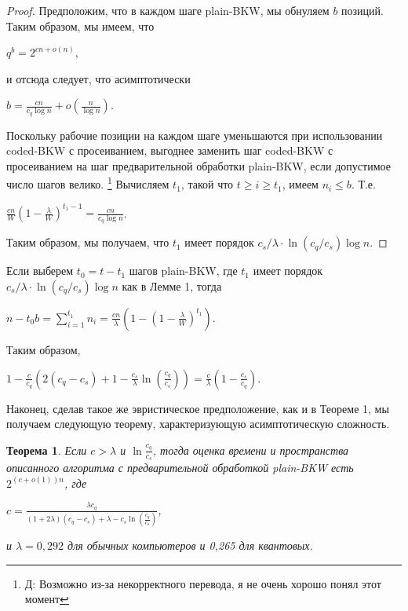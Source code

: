 \documentclass[a4paper,11pt]{article}
\newtheorem{theorem}{Теорема}
\begin{document}
\begin{center}
\end{center}

\begin{proof}
Предположим, что в каждом шаге plain-BKW, мы обнуляем $b$ позиций. Таким образом, мы имеем, что
\begin{center}
$q^b=2^{cn + o(n)}$, 
\end{center}
и отсюда следует, что асимптотически
\begin{center}
$b = \frac{cn}{c_q\log{n}} + o(\frac{n}{\log{n}})$.
\end{center}

Поскольку рабочие позиции на каждом шаге уменьшаются при использовании coded-BKW с просеиванием, выгоднее заменить шаг coded-BKW с просеиванием на шаг предварительной обработки plain-BKW, если допустимое число шагов велико. \footnote{Д: Возможно из-за некорректного перевода, я не очень хорошо понял этот момент} Вычисляем $t_1$, такой что $t \geq i \geq t_1$, имеем $n_i \leq b$. Т.е.
\begin{center}
$\frac{cn}{W}(1 - \frac{\lambda}{W})^{t_1 - 1} = \frac{cn}{c_q\log{n}}$.
\end{center}
Таким образом, мы получаем, что $t_1$ имеет порядок $c_s/\lambda \cdot \ln{(c_q/c_s)} \log{n}$.
\end{proof}

Если выберем $t_0=t - t_1$ шагов plain-BKW, где $t_1$ имеет порядок $c_s/\lambda \cdot \ln{(c_q/c_s)} \log{n}$ как в Лемме 1, тогда
\begin{center}
$n - t_0b = \sum_{i=1}^{t_1} n_i= \frac{cn}{\lambda}(1 - (1 - \frac{\lambda}{W})^{t_1})$.
\end{center}

Таким образом,
\begin{center}
$1 - \frac{c}{c_q}(2(c_q - c_s) + 1 - \frac{c_s}{\lambda}\ln{(\frac{c_q}{c_s})}) = \frac{c}{\lambda}(1 - \frac{c_s}{c_q})$.
\end{center}

Наконец, сделав такое же эвристическое предположение, как и в Теореме 1, мы получаем следующую теорему, характеризующую асимптотическую сложность.
\begin{theorem}
Если $c > \lambda$ и $\ln{\frac{c_q}{c_s}}$, тогда оценка времени и пространства описанного алгоритма с предварительной обработкой plain-BKW есть $2^{(c+o(1))n}$, где
\begin{center}
$c = \frac{\lambda c_q}{(1 + 2\lambda)(c_q - c_s) + \lambda - c_s\ln{(\frac{c_q}{c_s})}}$,
\end{center}
и $\lambda=0,292$ для обычных компьютеров и 0,265 для квантовых.
\end{theorem}
\end{document}

